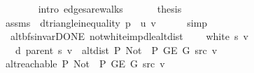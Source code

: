 \begin{isabellebody}
\ \ \ \ \ \ \isamarkupfalse%
\ {\isacharparenleft}{\kern0pt}intro\ edges{\isacharunderscore}{\kern0pt}are{\isacharunderscore}{\kern0pt}walks{\isacharparenright}{\kern0pt}\isanewline
\ \ \isamarkupfalse%
\isanewline
\ \ \isamarkupfalse%
\ {\isacharquery}{\kern0pt}thesis\isanewline
\ \ \ \ \isamarkupfalse%
\ assms{\isacharparenleft}{\kern0pt}{}{\isacharcomma}{\kern0pt}\ {}{\isacharparenright}{\kern0pt}\ d{\isacharunderscore}{\kern0pt}triangle{\isacharunderscore}{\kern0pt}inequality{\isacharbrackleft}{\kern0pt}\ {\isacharquery}{\kern0pt}p\ {\isacharequal}{\kern0pt}\ {\isachardoublequoteopen}{\isacharbrackleft}{\kern0pt}u{\isacharcomma}{\kern0pt}\ v{\isacharbrackright}{\kern0pt}{\isachardoublequoteclose}{\isacharbrackright}{\kern0pt}\isanewline
\ \ \ \ \isamarkupfalse%
\ simp\isanewline
{}\isamarkupfalse%
%
\endisatagproof
{\isafoldproof}%
%
\isadelimproof
\isanewline
%
\endisadelimproof
\isanewline
{}\isamarkupfalse%
\ {\isacharparenleft}{\kern0pt}\ alt{\isacharunderscore}{\kern0pt}bfs{\isacharunderscore}{\kern0pt}invar{\isacharunderscore}{\kern0pt}DONE{\isacharparenright}{\kern0pt}\ not{\isacharunderscore}{\kern0pt}white{\isacharunderscore}{\kern0pt}imp{\isacharunderscore}{\kern0pt}d{\isacharunderscore}{\kern0pt}le{\isacharunderscore}{\kern0pt}alt{\isacharunderscore}{\kern0pt}dist{\isacharcolon}{\kern0pt}\isanewline
\ \ \ {\isachardoublequoteopen}{\isasymnot}\ white\ s\ v{\isachardoublequoteclose}\isanewline
\ \ \ {\isachardoublequoteopen}d\ {\isacharparenleft}{\kern0pt}parent\ s{\isacharparenright}{\kern0pt}\ v\ {\isasymle}\ alt{\isacharunderscore}{\kern0pt}dist\ P{\isacharprime}{\kern0pt}{\isacharprime}{\kern0pt}\ {\isacharparenleft}{\kern0pt}Not\ {\isasymcirc}\ P{\isacharprime}{\kern0pt}{\isacharprime}{\kern0pt}{\isacharparenright}{\kern0pt}\ {\isacharparenleft}{\kern0pt}G{\isachardot}{\kern0pt}E\ G{\isacharparenright}{\kern0pt}\ src\ v{\isachardoublequoteclose}\isanewline
%
\isadelimproof
%
\endisadelimproof
%
\isatagproof
{}\isamarkupfalse%
\ {\isacharminus}{\kern0pt}\isanewline
\ \ \isamarkupfalse%
\ {\isachardoublequoteopen}alt{\isacharunderscore}{\kern0pt}reachable\ P{\isacharprime}{\kern0pt}{\isacharprime}{\kern0pt}\ {\isacharparenleft}{\kern0pt}Not\ {\isasymcirc}\ P{\isacharprime}{\kern0pt}{\isacharprime}{\kern0pt}{\isacharparenright}{\kern0pt}\ {\isacharparenleft}{\kern0pt}G{\isachardot}{\kern0pt}E\ G{\isacharparenright}{\kern0pt}\ src\ v{\isachardoublequoteclose}\isanewline

\end{isabellebody}
